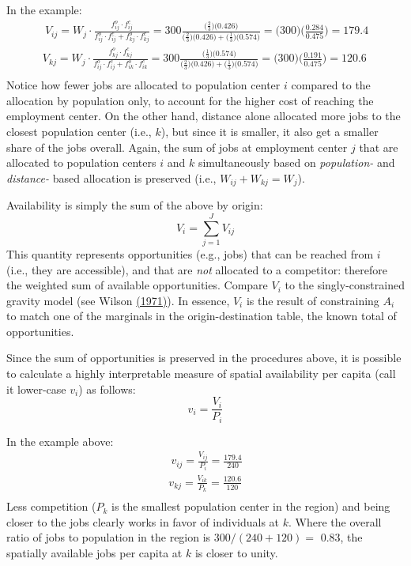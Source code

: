 \documentclass[]{elsarticle} %
\begin{document}
In the example: \[
\begin{array}{l}\
V_{ij} = W_j\cdot \frac{f^o_{ij} \cdot f^c_{ij}}{f^o_{ij} \cdot f^c_{ij} + f^o_{kj} \cdot f^c_{kj}} = 300 \frac{\big(\frac{2}{3} \big) \big(0.426 \big)}{\big(\frac{2}{3} \big) \big(0.426 \big) + \big(\frac{1}{3} \big) \big(0.574 \big)} = \big(300 \big)\big(\frac{0.284}{0.475} \big)= 179.4\\
V_{kj} = W_j\cdot \frac{f^o_{kj} \cdot f^c_{kj}}{f^o_{ij} \cdot f^c_{ij} + f^o_{ik} \cdot f^c_{ik}} = 300 \frac{\big(\frac{1}{3} \big) \big(0.574 \big)}{\big(\frac{2}{3} \big) \big(0.426 \big) + \big(\frac{1}{3} \big) \big(0.574 \big)}  = \big(300 \big)\big(\frac{0.191}{0.475} \big)= 120.6 \\
\end{array}
\] Notice how fewer jobs are allocated to population center \(i\)
compared to the allocation by population only, to account for the higher
cost of reaching the employment center. On the other hand, distance
alone allocated more jobs to the closest population center (i.e.,
\(k\)), but since it is smaller, it also get a smaller share of the jobs
overall. Again, the sum of jobs at employment center \(j\) that are
allocated to population centers \(i\) and \(k\) simultaneously based on
\emph{population-} and \emph{distance-} based allocation is preserved
(i.e., \(W_{ij} + W_{kj} = W_j\)).

Availability is simply the sum of the above by origin: \[
V_i = \sum_{j=1}^J V_{ij}
\] This quantity represents opportunities (e.g., jobs) that can be
reached from \(i\) (i.e., they are accessible), and that are \emph{not}
allocated to a competitor: therefore the weighted sum of available
opportunities. Compare \(V_i\) to the singly-constrained gravity model
(see Wilson \href{https://doi.org/10.1068/a030001}{(1971)}). In essence,
\(V_i\) is the result of constraining \(A_i\) to match one of the
marginals in the origin-destination table, the known total of
opportunities.

Since the sum of opportunities is preserved in the procedures above, it
is possible to calculate a highly interpretable measure of spatial
availability per capita (call it lower-case \(v_i\)) as follows: \[
v_i = \frac{V_i}{P_i}
\]

In the example above: \[
\begin{array}{l}\
v_{ij} = \frac{V_{ij}}{P_i} =  \frac{179.4}{240}\\
v_{kj} =  \frac{V_{ik}}{P_k} =  \frac{120.6}{120}\\
\end{array}
\] Less competition (\(P_k\) is the smallest population center in the
region) and being closer to the jobs clearly works in favor of
individuals at \(k\). Where the overall ratio of jobs to population in
the region is \(300/(240 + 120)=\) 0.83, the spatially available jobs
per capita at \(k\) is closer to unity.
\end{document}
